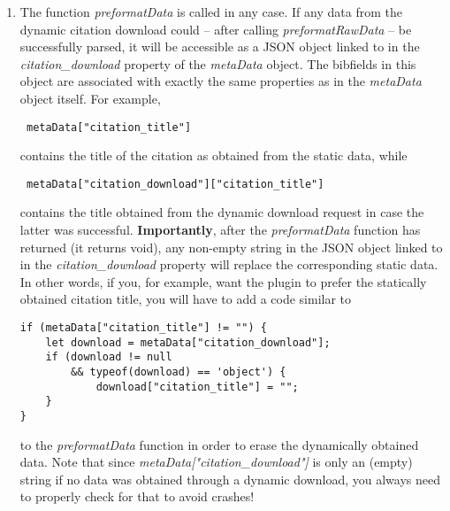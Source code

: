 \documentclass[
a4paper,
12pt,
]
{article}
\begin{document}
\begin{enumerate}
 \item The function \textit{preformatData} is called in any case. If any data from the dynamic citation download could -- after calling \textit{preformatRawData} -- be successfully parsed, it will be accessible as a JSON object linked to in the \textit{citation\_download} property of the \textit{metaData} object. The bibfields in this object are associated with exactly the same properties as in the \textit{metaData} object itself. For example,
 \begin{center}
\begin{lstlisting}
 metaData["citation_title"]
 \end{lstlisting}
\end{center}
contains the title of the citation as obtained from the static data, while
\begin{center}
\begin{lstlisting}
 metaData["citation_download"]["citation_title"]
 \end{lstlisting}
\end{center}
contains the title obtained from the dynamic download request in case the latter was successful. \textbf{Importantly}, after the \textit{preformatData} function has returned (it returns void), any non-empty string in the JSON object linked to in the \textit{citation\_download} property will replace the corresponding static data. In other words, if you, for example, want the plugin to prefer the statically obtained citation title, you will have to add a code similar to 
\begin{center}
\begin{lstlisting}
if (metaData["citation_title"] != "") {
	let download = metaData["citation_download"];
	if (download != null
		&& typeof(download) == 'object') {
		    download["citation_title"] = "";
	}	
}
\end{lstlisting}
\end{center}
to the \textit{preformatData} function in order to erase the dynamically obtained data. Note that since \textit{metaData["citation\_download"]} is only an (empty) string if no data was obtained through a dynamic download, you always need to properly check for that to avoid crashes!
\end{enumerate}
\end{document}
